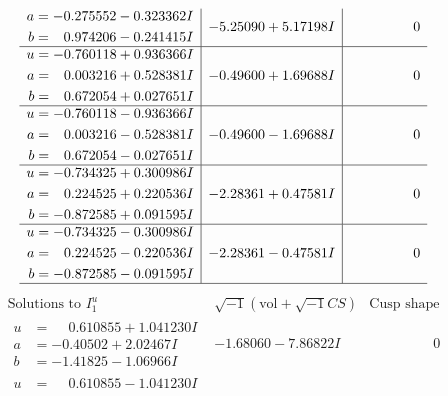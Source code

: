 \documentclass[1p]{elsarticle_modified}
\theoremstyle{definition}
\newcommand{\I}{\sqrt{-1}}
\begin{document}
$$\begin{array}{c|c|c}
\begin{aligned}
a &= -0.275552 - 0.323362 I \\
b &= \phantom{-}0.974206 - 0.241415 I\end{aligned}
 & -5.25090 + 5.17198 I & \phantom{-0.000000 } 0 \\ \hline\begin{aligned}
u &= -0.760118 + 0.936366 I \\
a &= \phantom{-}0.003216 + 0.528381 I \\
b &= \phantom{-}0.672054 + 0.027651 I\end{aligned}
 & -0.49600 + 1.69688 I & \phantom{-0.000000 } 0 \\ \hline\begin{aligned}
u &= -0.760118 - 0.936366 I \\
a &= \phantom{-}0.003216 - 0.528381 I \\
b &= \phantom{-}0.672054 - 0.027651 I\end{aligned}
 & -0.49600 - 1.69688 I & \phantom{-0.000000 } 0 \\ \hline\begin{aligned}
u &= -0.734325 + 0.300986 I \\
a &= \phantom{-}0.224525 + 0.220536 I \\
b &= -0.872585 + 0.091595 I\end{aligned}
 & -2.28361 + 0.47581 I & \phantom{-0.000000 } 0 \\ \hline\begin{aligned}
u &= -0.734325 - 0.300986 I \\
a &= \phantom{-}0.224525 - 0.220536 I \\
b &= -0.872585 - 0.091595 I\end{aligned}
 & -2.28361 - 0.47581 I & \phantom{-0.000000 } 0\\
 \hline 
 \end{array}$$\newpage$$\begin{array}{c|c|c}  
\text{Solutions to }I^u_{1}& \I (\text{vol} + \sqrt{-1}CS) & \text{Cusp shape}\\
 \hline 
\begin{aligned}
u &= \phantom{-}0.610855 + 1.041230 I \\
a &= -0.40502 + 2.02467 I \\
b &= -1.41825 - 1.06966 I\end{aligned}
 & -1.68060 - 7.86822 I & \phantom{-0.000000 } 0 \\ \hline\begin{aligned}
u &= \phantom{-}0.610855 - 1.041230 I \\

\end{aligned}
\end{array}$$
\end{document}
